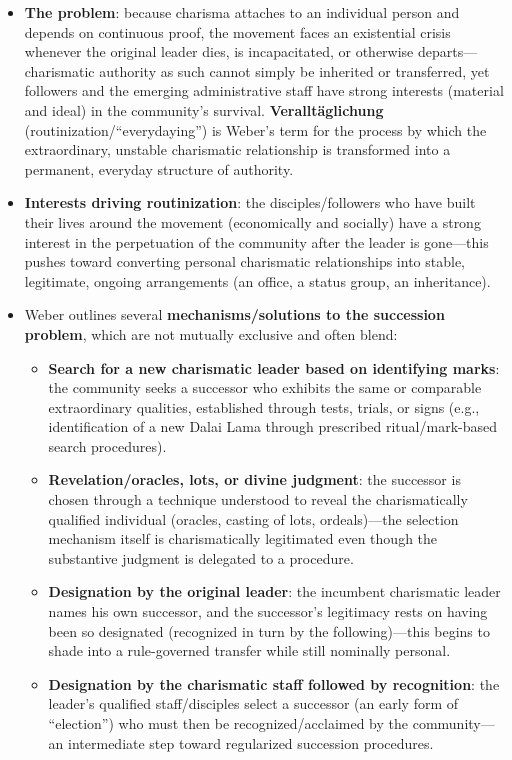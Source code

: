 \documentclass[12pt]{article}
\begin{document}
\begin{itemize}[leftmargin=*, itemsep=4pt]
    \item \textbf{The problem}: because charisma attaches to an individual person and depends on continuous proof, the movement faces an existential crisis whenever the original leader dies, is incapacitated, or otherwise departs---charismatic authority as such cannot simply be inherited or transferred, yet followers and the emerging administrative staff have strong interests (material and ideal) in the community's survival. \textbf{Veralltäglichung} (routinization/``everydaying'') is Weber's term for the process by which the extraordinary, unstable charismatic relationship is transformed into a permanent, everyday structure of authority.
    \item \textbf{Interests driving routinization}: the disciples/followers who have built their lives around the movement (economically and socially) have a strong interest in the perpetuation of the community after the leader is gone---this pushes toward converting personal charismatic relationships into stable, legitimate, ongoing arrangements (an office, a status group, an inheritance).
    \item Weber outlines several \textbf{mechanisms/solutions to the succession problem}, which are not mutually exclusive and often blend:
    \begin{itemize}
        \item \textbf{Search for a new charismatic leader based on identifying marks}: the community seeks a successor who exhibits the same or comparable extraordinary qualities, established through tests, trials, or signs (e.g., identification of a new Dalai Lama through prescribed ritual/mark-based search procedures).
        \item \textbf{Revelation/oracles, lots, or divine judgment}: the successor is chosen through a technique understood to reveal the charismatically qualified individual (oracles, casting of lots, ordeals)---the selection mechanism itself is charismatically legitimated even though the substantive judgment is delegated to a procedure.
        \item \textbf{Designation by the original leader}: the incumbent charismatic leader names his own successor, and the successor's legitimacy rests on having been so designated (recognized in turn by the following)---this begins to shade into a rule-governed transfer while still nominally personal.
        \item \textbf{Designation by the charismatic staff followed by recognition}: the leader's qualified staff/disciples select a successor (an early form of ``election'') who must then be recognized/acclaimed by the community---an intermediate step toward regularized succession procedures.

\end{itemize}
\end{itemize}
\end{document}
